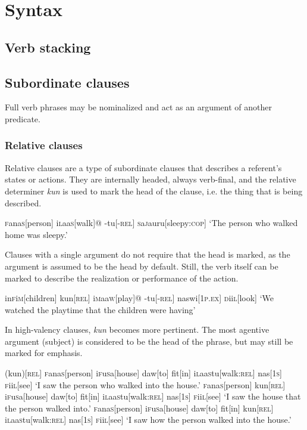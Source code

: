 \documentclass[a4paper,10pt,twoside,openright]{memoir}
\newcommand{\famword}[5]{#1\textsc{#2}#3\textsc{#4}#5}
\begin{document}
\chapter{Syntax}

\section{Verb stacking}

\section{Subordinate clauses}

Full verb phrases may be nominalized and act as an argument of another predicate.

\subsection{Relative clauses}

Relative clauses are a type of subordinate clauses that describes a referent's states or actions. They are internally headed, always verb-final, and the relative determiner \emph{kun} is used to mark the head of the clause, i.e. the thing that is being described.

\ex
\begingl
\famword{}{f}{ana}{s}{}[person]
\famword{i}{l}{aa}{s}{}[walk]@
-tu[\textsc{-rel}]
\famword{}{s}{a}{j}{a}uru[sleepy:\textsc{cop}]
\glft `The person who walked home was sleepy.'
\endgl
\xe

Clauses with a single argument do not require that the head is marked, as the argument is assumed to be the head by default. Still, the verb itself can be marked to describe the realization or performance of the action.

\ex
\begingl
\famword{in}{f}{i}{m}{}[children]
kun[\textsc{rel}]
\famword{i}{m}{aa}{w}{}[play]@
-tu[\textsc{-rel}]
naswi[\textsc{1p.ex}]
\famword{}{d}{ii}{l}{}[look]
\glft `We watched the playtime that the children were having'
\endgl
\xe

In high-valency clauses, \emph{kun} becomes more pertinent. The most agentive argument (subject) is considered to be the head of the phrase, but may still be marked for emphasis.

\pex[interpartskip=3ex]
\a
\begingl
(kun)[\textsc{rel}]
\famword{}{f}{ana}{s}{}[person]
\famword{i}{f}{u}{s}{a}[house]
daw[to]
fit[in]
\famword{i}{l}{aa}{s}{}tu[walk\textsc{:rel}]
nas[\textsc{1s}]
\famword{}{f}{ii}{l}{}[see]
\glft `I saw the person who walked into the house.'
\endgl
\a
\begingl
\famword{}{f}{ana}{s}{}[person]
kun[\textsc{rel}]
\famword{i}{f}{u}{s}{a}[house]
daw[to]
fit[in]
\famword{i}{l}{aa}{s}{}tu[walk\textsc{:rel}]
nas[\textsc{1s}]
\famword{}{f}{ii}{l}{}[see]
\glft `I saw the house that the person walked into.'
\endgl
\a
\begingl
\famword{}{f}{ana}{s}{}[person]
\famword{i}{f}{u}{s}{a}[house]
daw[to]
fit[in]
kun[\textsc{rel}]
\famword{i}{l}{aa}{s}{}tu[walk\textsc{:rel}]
nas[\textsc{1s}]
\famword{}{f}{ii}{l}{}[see]
\glft `I saw how the person walked into the house.'
\endgl
\xe
\end{document}

